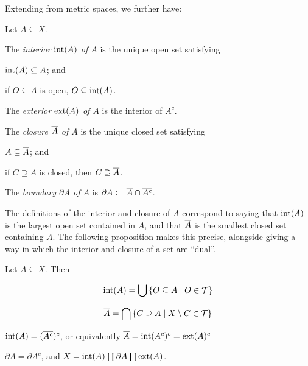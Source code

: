 \documentclass[11pt]{article}
\begin{document}
Extending from metric spaces, we further have:
\begin{definition}
    Let $A \subseteq X$.
    \begin{enum}
        \item The \emph{interior $\operatorname{int}(A)$ of $A$} is the unique open set satisfying 
        \begin{enum2}
            \item $\operatorname{int}(A) \subseteq A$; and
            \item if $O \subseteq A$ is open, $O \subseteq \operatorname{int}(A)$.
        \end{enum2}
        \item The \emph{exterior $\operatorname{ext}(A)$ of $A$} is the interior of $A^c$.
        \item The \emph{closure $\overline{A}$ of $A$} is the unique closed set satisfying
        \begin{enum2}
            \item $A \subseteq \overline{A}$; and
            \item if $C \supseteq A$ is closed, then $C \supseteq \overline{A}$.
        \end{enum2}
        \item The \emph{boundary $\partial A$ of $A$} is $\partial A \vcentcolon= \overline{A} \cap \overline{A^c}$.
    \end{enum}
\end{definition}
The definitions of the interior and closure of $A$ correspond to saying that $\operatorname{int}(A)$ is the largest open set contained in $A$, and that $\overline{A}$ is the smallest closed set containing $A$. The following proposition makes this precise, alongside giving a way in which the interior and closure of a set are ``dual''.
\begin{proposition}
    Let $A \subseteq X$. Then
    \begin{enum}
        \item $$
            \operatorname{int}(A) = \bigcup\left\{  O \subseteq A \mid O \in \mathcal{T}  \right\}
        $$
        \item $$
            \overline{A} = \bigcap\left\{  C \supseteq A \mid X \setminus C \in \mathcal{T}  \right\}
        $$
        \item $\operatorname{int}(A) = (\overline{A^c})^c$, or equivalently $\overline{A} = \operatorname{int}(A^c)^c = \operatorname{ext}(A)^c$
        \item $\partial A = \partial A^c$, and $X = \operatorname{int}(A) \coprod \partial A \coprod \operatorname{ext}(A)$.
    \end{enum}
\end{proposition}
\end{document}
